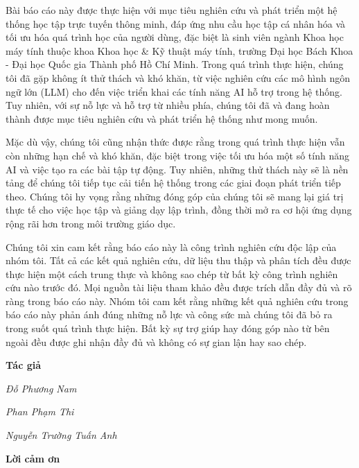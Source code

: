 \documentclass[12pt,a4paper]{report}
\theoremstyle{definition}
\begin{document}
\par Bài báo cáo này được thực hiện với mục tiêu nghiên cứu và phát triển một hệ thống học tập trực tuyến thông minh, đáp ứng nhu cầu học tập cá nhân hóa và tối ưu hóa quá trình học của người dùng, đặc biệt là sinh viên ngành Khoa học máy tính thuộc khoa Khoa học \& Kỹ thuật máy tính, trường Đại học Bách Khoa - Đại học Quốc gia Thành phố Hồ Chí Minh. Trong quá trình thực hiện, chúng tôi đã gặp không ít thử thách và khó khăn, từ việc nghiên cứu các mô hình ngôn ngữ lớn (LLM) cho đến việc triển khai các tính năng AI hỗ trợ trong hệ thống. Tuy nhiên, với sự nỗ lực và hỗ trợ từ nhiều phía, chúng tôi đã và đang hoàn thành được mục tiêu nghiên cứu và phát triển hệ thống như mong muốn.
\par Mặc dù vậy, chúng tôi cũng nhận thức được rằng trong quá trình thực hiện vẫn còn những hạn chế và khó khăn, đặc biệt trong việc tối ưu hóa một số tính năng AI và việc tạo ra các bài tập tự động. Tuy nhiên, những thử thách này sẽ là nền tảng để chúng tôi tiếp tục cải tiến hệ thống trong các giai đoạn phát triển tiếp theo. Chúng tôi hy vọng rằng những đóng góp của chúng tôi sẽ mang lại giá trị thực tế cho việc học tập và giảng dạy lập trình, đồng thời mở ra cơ hội ứng dụng rộng rãi hơn trong môi trường giáo dục.
\par Chúng tôi xin cam kết rằng báo cáo này là công trình nghiên cứu độc lập của nhóm tôi. Tất cả các kết quả nghiên cứu, dữ liệu thu thập và phân tích đều được thực hiện một cách trung thực và không sao chép từ bất kỳ công trình nghiên cứu nào trước đó. Mọi nguồn tài liệu tham khảo đều được trích dẫn đầy đủ và rõ ràng trong báo cáo này. Nhóm tôi cam kết rằng những kết quả nghiên cứu trong báo cáo này phản ánh đúng những nỗ lực và công sức mà chúng tôi đã bỏ ra trong suốt quá trình thực hiện. Bất kỳ sự trợ giúp hay đóng góp nào từ bên ngoài đều được ghi nhận đầy đủ và không có sự gian lận hay sao chép.

\par\hfill\textbf{Tác giả}\hspace{1cm}
\par\hfill\textit{Đỗ Phương Nam}
\par\hfill\textit{Phan Phạm Thi}\hspace{0.3cm}
\par\hfill\textit{Nguyễn Trường Tuấn Anh}\hspace{0.2cm}
\newpage

\begin{center}
    \textbf{\Large Lời cảm ơn}
\end{center}
\end{document}

